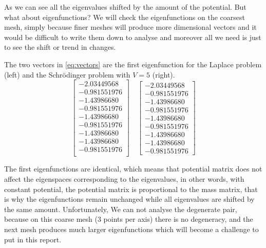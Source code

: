 \documentclass[acmsmall,screen]{MapleTrans}
\begin{document}
As we can see all the eigenvalues shifted by the amount of the potential. But what about eigenfunctions? We will check the eigenfunctions on the coarsest mesh, simply because finer meshes will produce more dimensional vectors and it would be difficult to write them down to analyse and moreover all we need is just to see the shift or trend in changes.

The two vectors in \eqref{eq:vectors} are the first eigenfunction for the Laplace problem (left) and the Schr\"{o}dinger problem with $V = 5$ (right).
\begin{equation}
    \begin{bmatrix}
        -2.03449568 \\
        -0.981551976 \\
        -1.43986680 \\
        -0.981551976 \\
        -1.43986680 \\
        -0.981551976 \\
        -1.43986680 \\
        -1.43986680 \\
        -0.981551976 \\
    \end{bmatrix}  \quad
    \begin{bmatrix}
        -2.03449568 \\
        -0.981551976 \\
        -1.43986680 \\
        -0.981551976 \\
        -1.43986680 \\
        -0.981551976 \\
        -1.43986680 \\
        -1.43986680 \\
        -0.981551976
    \end{bmatrix} 
    \label{eq:vectors}
\end{equation}

The first eigenfunctions are identical, which means that potential matrix does not affect the eigenspaces corresponding to the eigenvalues, in other words, with constant potential, the potential matrix is proportional to the mass matrix, that is why the eigenfunctions remain unchanged while all eigenvalues are shifted by the same amount. Unfortunately, We can not analyse the degenerate pair, because on this coarse mesh (3 points per axis) there is no degeneracy, and the next mesh produces much larger eigenfunctions which will become a challenge to put in this report.
\end{document}
